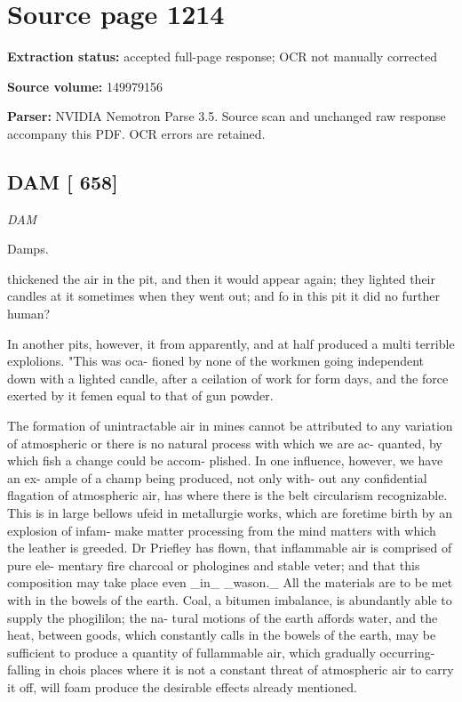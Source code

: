 \clearpage
\section{Source page 1214}
\textbf{Extraction status:} accepted full-page response; OCR not manually corrected\par
\textbf{Source volume:} 149979156\par
\textbf{Parser:} NVIDIA Nemotron Parse 3.5. Source scan and unchanged raw response accompany this PDF. OCR errors are retained.\par\medskip
\subsection*{DAM [ 658]}
{\small\itshape DAM\par}\medskip
Damps.\par\medskip
thickened the air in the pit, and then it would appear again; they lighted their candles at it sometimes when they went out; and fo in this pit it did no further human?\par\medskip
In another pits, however, it from apparently, and at half produced a multi terrible explolions. "This was oca- fioned by none of the workmen going independent down with a lighted candle, after a ceilation of work for form days, and the force exerted by it femen equal to that of gun powder.\par\medskip
The formation of unintractable air in mines cannot be attributed to any variation of atmospheric or there is no natural process with which we are ac- quanted, by which fish a change could be accom- plished. In one influence, however, we have an ex- ample of a champ being produced, not only with- out any confidential flagation of atmospheric air, has where there is the belt circularism recognizable. This is in large bellows ufeid in metallurgie works, which are foretime birth by an explosion of infam- make matter processing from the mind matters with which the leather is greeded. Dr Priefley has flown, that inflammable air is comprised of pure ele- mentary fire charcoal or phologines and stable veter; and that this composition may take place even \_in\_ \_wason.\_ All the materials are to be met with in the bowels of the earth. Coal, a bitumen imbalance, is abundantly able to supply the phogililon; the na- tural motions of the earth affords water, and the heat, between goods, which constantly calls in the bowels of the earth, may be sufficient to produce a quantity of fullammable air, which gradually occurring- falling in chois places where it is not a constant threat of atmospheric air to carry it off, will foam produce the desirable effects already mentioned.\par\medskip
